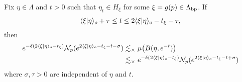 \begin{corollary}
\label{corollaryglobalmeasure22}
Fix $\eta\in\Lambda$ and $t > 0$ such that $\eta_t\in H_\xi$ for some $\xi = g(p)\in\Lambda_{\mathrm{bp}}$. If
\begin{equation}
\label{globalmeasure22hypothesis}
\langle \xi|\eta\rangle_o + \tau \leq t \leq 2\langle \xi|\eta\rangle_o - t_\xi - \tau,
\end{equation}
then
\begin{equation}
\label{globalmeasure22}
\begin{split}
e^{-\delta (2\langle \xi|\eta\rangle_o - t_\xi)} \mathcal N_p(e^{2\langle \xi|\eta\rangle_o - t_\xi - t - \sigma})
&\lesssim_\times \mu\big(B(\eta,e^{-t})\big)\\ 
&\lesssim_\times e^{-\delta (2\langle \xi|\eta\rangle_o - t_\xi)} \mathcal N_p(e^{2\langle \xi|\eta\rangle_o - t_\xi - t + \sigma})
\end{split}
\end{equation}
where $\sigma,\tau > 0$ are independent of $\eta$ and $t$.
\end{corollary}
